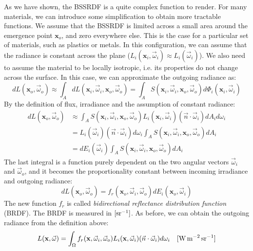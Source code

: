 As we have shown, the BSSRDF is a quite complex function to render. For many materials, we can introduce some simplification to obtain more tractable functions. We assume that the BSSRDF is limited across a small area around the emergence point $\mathbf{x}_o$, and zero everywhere else. This is the case for a particular set of materials, such as plastics or metals. In this configuration, we can assume that the radiance is constant across the plane ($L_i(\mathbf{x}_i, \vec{\omega}_i) \approx L_i(\vec{\omega}_i)$). We also need to assume the material to be locally isotropic, i.e. its properties do not change across the surface. In this case, we can approximate the outgoing radiance as:
\begin{equation*}
d L(\mathbf{x}_o, \vec{\omega}_o) \approx \int_A d L(\mathbf{x}_i, \vec{\omega}_i, \mathbf{x}_o, \vec{\omega}_o) = \int_A S(\mathbf{x}_i, \vec{\omega}_i, \mathbf{x}_o, \vec{\omega}_o) d \Phi_i(\mathbf{x}_i, \vec{\omega}_i) 
\end{equation*}
By the definition of flux, irradiance and the assumption of constant radiance:
\begin{equation*}
\begin{split}
d L(\mathbf{x}_o, \vec{\omega}_o) &\approx \int_A S(\mathbf{x}_i, \vec{\omega}_i, \mathbf{x}_o, \vec{\omega}_o) L_i(\mathbf{x}_i, \vec{\omega}_i) (\vec{n} \cdot \vec{\omega}_i) d A_i d \omega_i  \\ &= L_i(\vec{\omega}_i) (\vec{n} \cdot \vec{\omega}_i) d \omega_i \int_A S(\mathbf{x}_i, \vec{\omega}_i, \mathbf{x}_o, \vec{\omega}_o)   d A_i \\ &= d E_i(\vec{\omega}_i) \int_A S(\mathbf{x}_i, \vec{\omega}_i, \mathbf{x}_o, \vec{\omega}_o) d A_i
\end{split}
\end{equation*}
The last integral is a function purely dependent on the two angular vectors $\vec{\omega}_i$ and $\vec{\omega}_o$, and it becomes the proportionality constant between incoming irradiance and outgoing radiance:
\begin{equation*}
d L(\mathbf{x}_o, \vec{\omega}_o) = f_r(\mathbf{x}_o, \vec{\omega}_i, \vec{\omega}_o) d E_i(\mathbf{x}_o, \vec{\omega}_i)
\end{equation*}
 The new function $f_r$ is called \emph{bidirectional reflectance distribution function} (BRDF). The BRDF is measured in $\siunitnospace{\per \steradian}$. As before, we can obtain the outgoing radiance from the definition above:
\begin{equation*}
L(\mathbf{x}, \vec{\omega}) = \int_\Omega f_r(\mathbf{x}, \vec{\omega}_i,  \vec{\omega}_o) L_i(\mathbf{x}, \vec{\omega}_i) (\vec{n} \cdot \vec{\omega}_i) d{\omega}_i  \siunit{\watt \per \square \metre \per \steradian}
\end{equation*}
